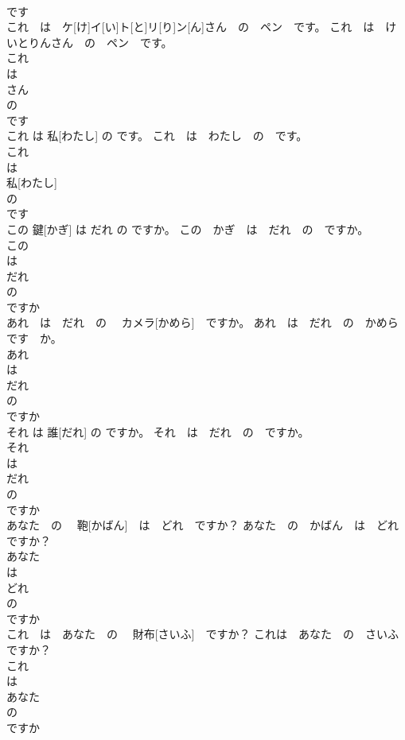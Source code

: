 \documentclass[8pt]{extreport}
\begin{document}
\begin{CJK}{UTF8}{min}
\\	です 
\\	これ　は　ケ[け]イ[い]ト[と]リ[り]ン[ん]さん　の　ペン　です。	これ　は　けいとりんさん　の　ペン　です。	
\\	これ 
\\	は 
\\	さん 
\\	の 
\\	です 
\\	これ は 私[わたし] の です。	これ　は　わたし　の　です。	
\\	これ 
\\	は 
\\	私[わたし] 
\\	の 
\\	です 
\\	この 鍵[かぎ] は だれ の ですか。	この　かぎ　は　だれ　の　ですか。	
\\	この 
\\	は 
\\	だれ 
\\	の 
\\	ですか 
\\	あれ　は　だれ　の 　カメラ[かめら]　ですか。	あれ　は　だれ　の　かめら　です　か。	
\\	あれ 
\\	は 
\\	だれ 
\\	の 
\\	ですか 
\\	それ は 誰[だれ] の ですか。	それ　は　だれ　の　ですか。	
\\	それ 
\\	は 
\\	だれ 
\\	の 
\\	ですか 
\\	あなた　の 　鞄[かばん]　は　どれ　ですか？	あなた　の　かばん　は　どれ　ですか？	
\\	あなた 
\\	は 
\\	どれ 
\\	の 
\\	ですか 
\\	これ　は　あなた　の　 財布[さいふ]　ですか？	これは　あなた　の　さいふ　ですか？	
\\	これ 
\\	は 
\\	あなた 
\\	の 
\\	ですか 

\end{CJK}
\end{document}
